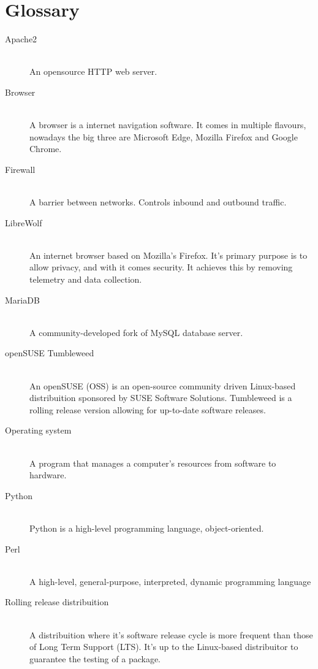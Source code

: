 \documentclass[11pt,a4paper]{report}
\begin{document}
\chapter*{Glossary}

    \begin{description}
        \item[Apache2] \hfill \\
            An opensource HTTP web server.
        \item[Browser] \hfill \\
            A browser is a internet navigation software. It comes in multiple flavours, nowadays the big three are Microsoft Edge, Mozilla Firefox and Google Chrome.
        \item[Firewall] \hfill \\
            A barrier between networks. Controls inbound and outbound traffic.
        \item[LibreWolf] \hfill \\
            An internet browser based on Mozilla's Firefox. It's primary purpose is to allow privacy, and with it comes security. It achieves this by removing telemetry and data collection.
        \item[MariaDB] \hfill \\
            A community-developed fork of MySQL database server.
        \item[openSUSE Tumbleweed] \hfill \\
            An openSUSE (OSS) is an open-source community driven Linux-based distribuition sponsored by SUSE Software Solutions. Tumbleweed is a rolling release version allowing for up-to-date software releases.
        \item[Operating system] \hfill \\
            A program that manages a computer's resources from software to hardware.
        \item[Python] \hfill \\
            Python is a high-level programming language, object-oriented.
        \item[Perl] \hfill \\
            A high-level, general-purpose, interpreted, dynamic programming language
        \item[Rolling release distribuition] \hfill \\
            A distribuition where it's software release cycle is more frequent than those of Long Term Support (LTS). It's up to the Linux-based distribuitor to guarantee the testing of a package.

\end{description}
\end{document}
